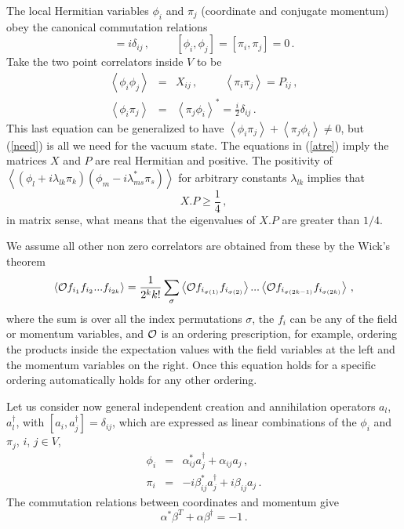 \documentclass[11pt]{article}
\begin{document}
The local Hermitian variables  $\phi _{i}$ and $\pi _{j}$ (coordinate and conjugate momentum) obey the canonical commutation relations 
\begin{equation}
[\phi _{i},\pi _{j}]=i\delta _{ij}\,,\hspace{1cm} [\phi _{i},\phi _{j}]=[\pi _{i},\pi _{j}]=0\,.
\end{equation} 
Take the two point correlators inside $V$ to be 
\begin{eqnarray}
\left\langle \phi _{i}\phi _{j}\right\rangle &=& X_{ij} \,, \hspace{1cm}\left\langle \pi _{i}\pi _{j}\right\rangle =P_{ij} \,, \label{atre}\\
 \left\langle \phi _{i}\pi _{j}\right\rangle &=& \left\langle \pi _{j}\phi _{i}\right\rangle^*=\frac{i}{2}\delta _{ij}\,.\label{need}
\end{eqnarray}
This last equation can be generalized to have $\left\langle \phi _{i}\pi _{j}\right\rangle + \left\langle \pi _{j}\phi _{i}\right\rangle\neq 0$, but (\ref{need}) is all we need for the vacuum state. 
The equations in (\ref{atre}) imply the matrices $X$ and $P$ are real Hermitian and positive. The positivity of $\left\langle (\phi _{l}+i \lambda_{lk} \pi_k )(\phi _{m}-i \lambda^*_{ms} \pi_s)\right\rangle $ for arbitrary constants $\lambda_{lk}$ implies that
\begin{equation}
X.P\ge \frac{1}{4}\label{popo}\,,
\end{equation} 
in matrix sense, what means that the eigenvalues of $X.P$ are greater than $1/4$. 

We assume all other non zero correlators are obtained from these by the Wick's   theorem 
\begin{equation}
\left<{\cal O} f_{i_1} f_{i_2}...f_{i_{2k}}\right>=\frac{1}{2^k k!}\sum_{\sigma}\left<{\cal O}f_{i_{\sigma(1)}} f_{i_{\sigma(2)}}\right>... \left<{\cal O} f_{i_{\sigma(2k-1)}} f_{i_{\sigma(2k)}}\right>\,,\label{quin}
\end{equation}
where the sum is over all the index permutations $\sigma$, the $f_i$ can be any of the field or momentum variables, and ${\cal O}$ is an ordering prescription, for example, ordering the products inside the expectation values with the field variables at the left and the momentum variables on the right. Once this equation holds for a specific ordering automatically holds for any other ordering.    
  
Let us consider now general independent creation and annihilation operators $a_{l}$, $a_l^\dagger$, 
with $
[a_{i},a_{j}^{\dagger }]=\delta _{ij}$, 
 which are 
expressed as linear combinations of the $\phi _{i}$ and $\pi _{j}$, $i$, $j\in V$,
\begin{eqnarray}
\phi_i&=&\alpha_{ij}^* a^\dagger_j+ \alpha_{ij} a_j\,,\label{sie}\\
\pi_i&=& -i \beta_{ij}^*  a^\dagger_j+ i \beta_{ij}  a_j\,.\label{oto} 
\end{eqnarray} 
The commutation relations between coordinates and momentum give 
\begin{equation}
\alpha^* \beta^T +\alpha \beta^\dagger =-1\,.
\end{equation}
\end{document}
